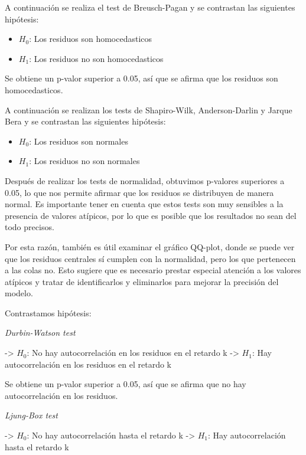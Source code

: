 \documentclass[
]{article}
\providecommand{\tightlist}{%
  \setlength{\itemsep}{0pt}\setlength{\parskip}{0pt}}
\begin{document}
\medskip

A continuación se realiza el test de Breusch-Pagan y se contrastan las
siguientes hipótesis:

\begin{itemize}
\tightlist
\item
  \(H_0\): Los residuos son homocedasticos
\item
  \(H_1\): Los residuos no son homocedasticos
\end{itemize}

Se obtiene un p-valor superior a 0.05, así que se afirma que los
residuos son homocedasticos.

\medskip

A continuación se realizan los tests de Shapiro-Wilk, Anderson-Darlin y
Jarque Bera y se contrastan las siguientes hipótesis:

\begin{itemize}
\tightlist
\item
  \(H_0\): Los residuos son normales
\item
  \(H_1\): Los residuos no son normales
\end{itemize}

Después de realizar los tests de normalidad, obtuvimos p-valores
superiores a 0.05, lo que nos permite afirmar que los residuos se
distribuyen de manera normal. Es importante tener en cuenta que estos
tests son muy sensibles a la presencia de valores atípicos, por lo que
es posible que los resultados no sean del todo precisos.

Por esta razón, también es útil examinar el gráfico QQ-plot, donde se
puede ver que los residuos centrales sí cumplen con la normalidad, pero
los que pertenecen a las colas no. Esto sugiere que es necesario prestar
especial atención a los valores atípicos y tratar de identificarlos y
eliminarlos para mejorar la precisión del modelo.

\medskip

Contrastamos hipótesis:

\emph{Durbin-Watson test}

-\textgreater{} \(H_0\): No hay autocorrelación en los residuos en el
retardo k -\textgreater{} \(H_1\): Hay autocorrelación en los residuos
en el retardo k

Se obtiene un p-valor superior a 0.05, así que se afirma que no hay
autocorrelación en los residuos.

\emph{Ljung-Box test}

-\textgreater{} \(H_0\): No hay autocorrelación hasta el retardo k
-\textgreater{} \(H_1\): Hay autocorrelación hasta el retardo k
\end{document}
